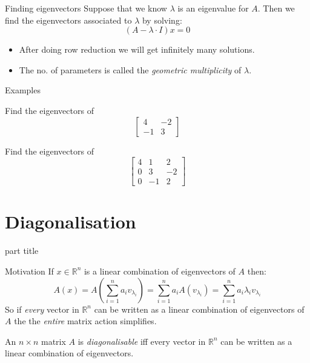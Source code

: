 \documentclass{beamer}
\begin{document}
\begin{frame}{Finding eigenvectors}
Suppose that we know $\lambda$ is an eigenvalue for $A$.\vfill
Then we find the eigenvectors associated to $\lambda$ by solving:
\begin{equation*}
(A-\lambda\cdot I)x = 0
\end{equation*}\vfill
\begin{itemize}
	\item After doing row reduction we will get infinitely many solutions.
	\item The no. of parameters is called the \emph{geometric multiplicity} of $\lambda$.
\end{itemize}
\end{frame}

\begin{frame}{Examples}
\begin{example}
	Find the eigenvectors of
	\begin{equation*}
		\left[
		\begin{matrix}
		4&-2\\
		-1&3
		\end{matrix}
		\right]
	\end{equation*}
\end{example}
\begin{example}
	Find the eigenvectors of
	\begin{equation*}
		\left[
		\begin{matrix}
		4&1&2\\
		0&3&-2\\
		0&-1&2
		\end{matrix}
		\right]
	\end{equation*}
\end{example}
\end{frame}


\section{Diagonalisation}

\begin{frame}
\begin{beamercolorbox}[sep=12pt,center]{part title}
\insertsection\par
\end{beamercolorbox}
\end{frame}

\begin{frame}{Motivation}
If $x\in \mathbb{R}^n$ is a linear combination of eigenvectors of $A$ then:
\begin{equation*}
	A(x) = A\left(\sum_{i=1}^n a_i v_{\lambda_i}\right) = \sum_{i=1}^n a_iA(v_{\lambda_i}) = \sum_{i=1}^n a_i\lambda_iv_{\lambda_i}
\end{equation*}
So if \emph{every} vector in $\mathbb{R}^n$ can be written as a linear combination of eigenvectors of $A$ the the \emph{entire} matrix action simplifies.\vfill
\begin{definition}
	An $n\times n$ matrix $A$ is \emph{diagonalisable} iff every vector in $\mathbb{R}^n$ can be written as a linear combination of eigenvectors.
\end{definition}
\end{frame}
\end{document}
